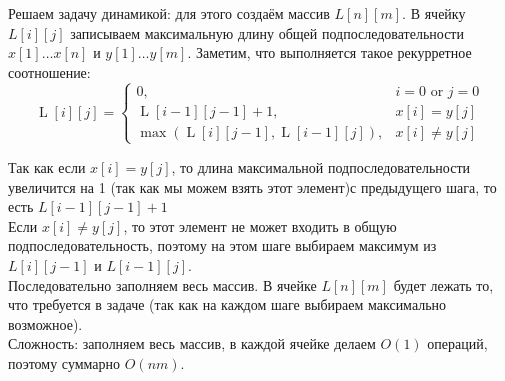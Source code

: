 \documentclass[a4paper,12pt]{article} %
\begin{document}
Решаем задачу динамикой: для этого создаём массив $ L[n][m] $. В ячейку $ L[i][j] $ записываем максимальную длину общей подпоследовательности $x[1] \ldots x[n]$
и $y[1] \ldots y[m]$. Заметим, что выполняется такое рекурретное соотношение:
$$\operatorname{L}[i][j]=\left\{\begin{array}{ll}
0, & i=0 \text { or } j=0 \\
\operatorname{L}[i-1][j-1]+1, & x[i]=y[j] \\
\max (\operatorname{L}[i][j-1], \operatorname{L}[i-1][j]), & x[i] \neq y[j]
\end{array}\right.$$

Так как если $ x[i]=y[j] $, то длина максимальной подпоследовательности увеличится на 1 (так как мы можем взять этот элемент)с предыдущего шага, то есть $ L[i-1][j-1]+1 $\\

Если $ x[i] \neq y[j] $, то этот элемент не может входить в общую подпоследовательность, поэтому на этом шаге выбираем максимум из $ L[i][j-1] $ и $ L[i-1][j] $.\\

Последовательно заполняем весь массив. В ячейке $ L[n][m] $ будет лежать то, что требуется в задаче (так как на каждом шаге выбираем максимально возможное).\\

Сложность: заполняем весь массив, в каждой ячейке делаем $ O(1) $ операций, поэтому суммарно $ O(nm) $.
\end{document}
